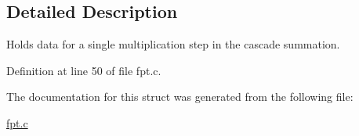 \subsection{Detailed Description}
Holds data for a single multiplication step in the cascade summation. 



Definition at line 50 of file fpt.c.

The documentation for this struct was generated from the following file:\begin{CompactItemize}
\item 
\hyperlink{fpt_8c}{fpt.c}\end{CompactItemize}
